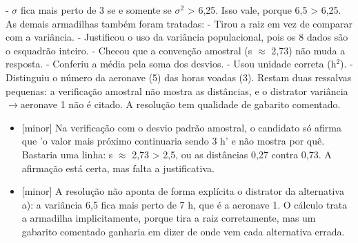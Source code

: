 \documentclass{article}%
\begin{document}
{-} $\sigma$ fica mais perto de 3 se e somente se $\sigma$$^2$ > 6,25. Isso vale, porque 6,5 > 6,25.\newline%
\newline%
As demais armadilhas também foram tratadas:\newline%
{-} Tirou a raiz em vez de comparar com a variância.\newline%
{-} Justificou o uso da variância populacional, pois os 8 dados são o esquadrão inteiro.\newline%
{-} Checou que a convenção amostral (s $\approx$ 2,73) não muda a resposta.\newline%
{-} Conferiu a média pela soma dos desvios.\newline%
{-} Usou unidade correta (h$^2$).\newline%
{-} Distinguiu o número da aeronave (5) das horas voadas (3).\newline%
\newline%
Restam duas ressalvas pequenas: a verificação amostral não mostra as distâncias, e o distrator variância$\to$aeronave 1 não é citado. A resolução tem qualidade de gabarito comentado.%
\begin{itemize}%
\item%
{[}minor{]} Na verificação com o desvio padrão amostral, o candidato só afirma que 'o valor mais próximo continuaria sendo 3 h' e não mostra por quê. Bastaria uma linha: s $\approx$ 2,73 > 2,5, ou as distâncias 0,27 contra 0,73. A afirmação está certa, mas falta a justificativa.%
\item%
{[}minor{]} A resolução não aponta de forma explícita o distrator da alternativa a): a variância 6,5 fica mais perto de 7 h, que é a aeronave 1. O cálculo trata a armadilha implicitamente, porque tira a raiz corretamente, mas um gabarito comentado ganharia em dizer de onde vem cada alternativa errada.%
\end{itemize}%
\end{document}
